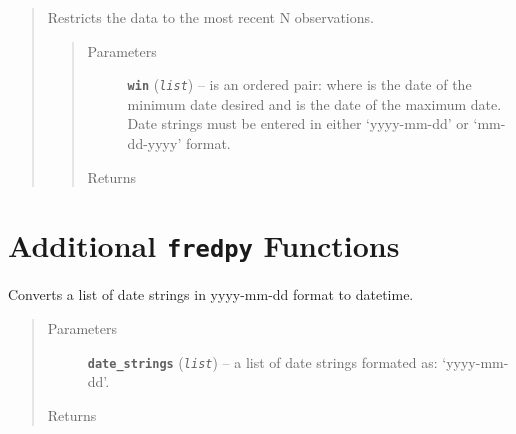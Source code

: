 \documentclass[letterpaper,10pt,english]{sphinxmanual}
\begin{document}
\begin{fulllineitems}
\begin{quote}
\begin{fulllineitems}
\end{fulllineitems}


\begin{fulllineitems}
\label{series_class:fredpy.series.window}
Restricts the data to the most recent N observations.
\begin{quote}\begin{description}
\item[{Parameters}] \leavevmode
\textbf{\texttt{win}} (\emph{\texttt{list}}) -- is an ordered pair:  where  is the date of the minimum date desired and  is the date of the maximum date. Date strings must be entered in either `yyyy-mm-dd' or `mm-dd-yyyy' format.

\item[{Returns}] \leavevmode
{\hyperref[series_class:fredpy.series]{}}

\end{description}\end{quote}

\end{fulllineitems}

\end{quote}

\end{fulllineitems}



\chapter{Additional \texttt{fredpy} Functions}
\label{additional_functions::doc}\label{additional_functions:additional-fredpy-functions}

\begin{fulllineitems}
\label{additional_functions:fredpy.date_times}
Converts a list of date strings in yyyy-mm-dd format to datetime.
\begin{quote}\begin{description}
\item[{Parameters}] \leavevmode
\textbf{\texttt{date\_strings}} (\emph{\texttt{list}}) -- a list of date strings formated as: `yyyy-mm-dd'.

\item[{Returns}] \leavevmode
{}

\end{description}\end{quote}

\end{fulllineitems}
\end{document}
